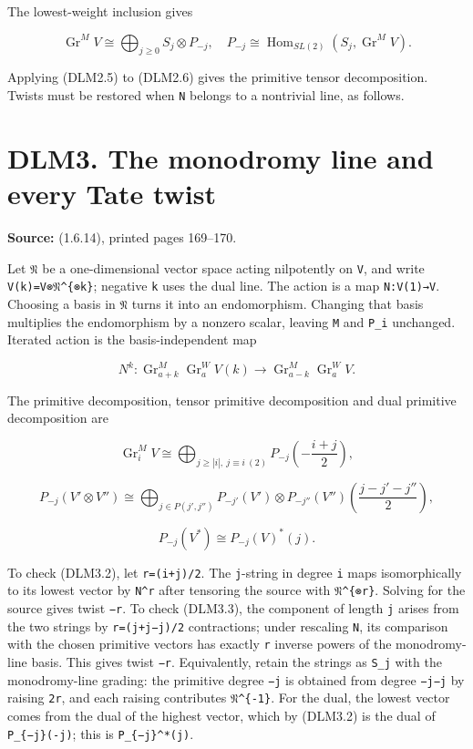\documentclass[
]{report}
\begin{document}
The lowest-weight inclusion gives

\[
\operatorname{Gr}^M V\cong\bigoplus_{j\ge0}S_j\otimes P_{-j},
\quad
P_{-j}\cong\operatorname{Hom}_{SL(2)}(S_j,\operatorname{Gr}^M V).
\tag{DLM2.6}
\]

Applying (DLM2.5) to (DLM2.6) gives the primitive tensor decomposition.
Twists must be restored when \texttt{N} belongs to a nontrivial line, as
follows.

\section{DLM3. The monodromy line and every Tate
twist}\label{dlm3.-the-monodromy-line-and-every-tate-twist}

\textbf{Source:} (1.6.14), printed pages 169--170.

Let \texttt{𝔑} be a one-dimensional vector space acting nilpotently on
\texttt{V}, and write \texttt{V(k)=V⊗𝔑\^{}\{⊗k\}}; negative \texttt{k}
uses the dual line. The action is a map \texttt{N:V(1)→V}. Choosing a
basis in \texttt{𝔑} turns it into an endomorphism. Changing that basis
multiplies the endomorphism by a nonzero scalar, leaving \texttt{M} and
\texttt{P\_i} unchanged. Iterated action is the basis-independent map

\[
N^k:\operatorname{Gr}_{a+k}^M\operatorname{Gr}_a^W V(k)
\longrightarrow\operatorname{Gr}_{a-k}^M\operatorname{Gr}_a^W V.
\tag{DLM3.1}
\]

The primitive decomposition, tensor primitive decomposition and dual
primitive decomposition are

\[
\operatorname{Gr}_i^M V\cong
\bigoplus_{j\ge|i|,\ j\equiv i\ (2)}P_{-j}\left(-\frac{i+j}{2}\right),
\tag{DLM3.2}
\]

\[
P_{-j}(V'\otimes V'')\cong
\bigoplus_{j\in P(j',j'')}
P_{-j'}(V')\otimes P_{-j''}(V'')
\left(\frac{j-j'-j''}{2}\right),
\tag{DLM3.3}
\]

\[
P_{-j}(V^*)\cong P_{-j}(V)^*(j).
\tag{DLM3.4}
\]

To check (DLM3.2), let \texttt{r=(i+j)/2}. The \texttt{j}-string in
degree \texttt{i} maps isomorphically to its lowest vector by
\texttt{N\^{}r} after tensoring the source with \texttt{𝔑\^{}\{⊗r\}}.
Solving for the source gives twist \texttt{−r}. To check (DLM3.3), the
component of length \texttt{j} arises from the two strings by
\texttt{r=(j\textquotesingle{}+j\textquotesingle{}\textquotesingle{}−j)/2}
contractions; under rescaling \texttt{N}, its comparison with the chosen
primitive vectors has exactly \texttt{r} inverse powers of the
monodromy-line basis. This gives twist \texttt{−r}. Equivalently, retain
the strings as \texttt{S\_j} with the monodromy-line grading: the
primitive degree \texttt{−j} is obtained from degree
\texttt{−j\textquotesingle{}−j\textquotesingle{}\textquotesingle{}} by
raising \texttt{2r}, and each raising contributes \texttt{𝔑\^{}\{-1\}}.
For the dual, the lowest vector comes from the dual of the highest
vector, which by (DLM3.2) is the dual of \texttt{P\_\{−j\}(-j)}; this is
\texttt{P\_\{−j\}\^{}*(j)}.
\end{document}
